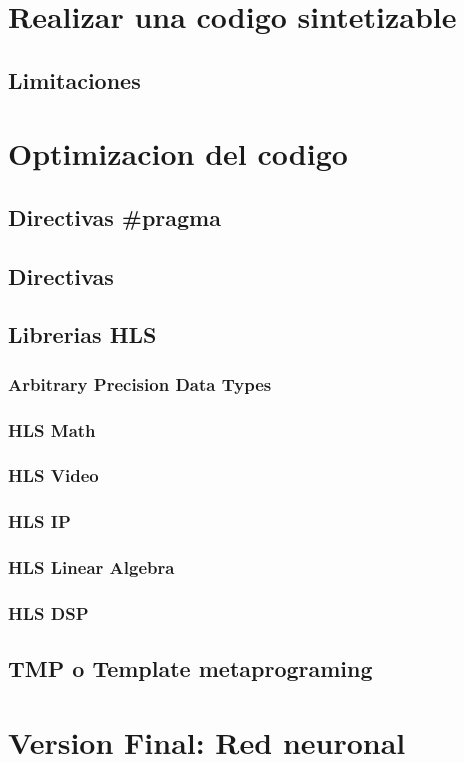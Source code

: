 \documentclass[11pt,spanish,listoffigures,listoftables]{tfgetsinf}
\begin{document}
\chapter{Realizar una codigo sintetizable}
   \section {Limitaciones}
\chapter{Optimizacion del codigo}
\section{Directivas \#pragma}
   \section {Directivas}
\section{Librerias HLS}
      \subsection{Arbitrary Precision Data Types}
      \subsection{HLS Math}
      \subsection{HLS Video}
      \subsection{HLS IP}
      \subsection{HLS Linear Algebra}
      \subsection{HLS DSP}
\section{TMP o Template metaprograming}
\chapter{Version Final: Red neuronal}
\end{document}
